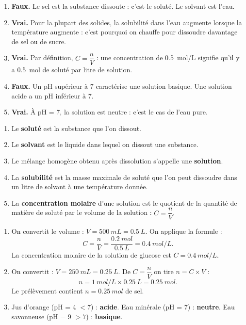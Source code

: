 \documentclass[11pt]{article}
\newcommand{\cle}[1]{{\popxbold\color{popdark}#1}}
\begin{document}
\begin{corrige}
\begin{enumerate}
\item \textbf{Faux.} Le sel est la substance dissoute : c'est le \cle{soluté}. Le solvant est l'eau.
\item \textbf{Vrai.} Pour la plupart des solides, la \cle{solubilité} dans l'eau augmente lorsque la température augmente : c'est pourquoi on chauffe pour dissoudre davantage de sel ou de sucre.
\item \textbf{Vrai.} Par définition, $C = \dfrac{n}{V}$ : une concentration de \SI{0,5}{mol/L} signifie qu'il y a \SI{0,5}{mol} de soluté par litre de solution.
\item \textbf{Faux.} Un pH supérieur à 7 caractérise une solution \cle{basique}. Une solution acide a un pH inférieur à 7.
\item \textbf{Vrai.} À pH = 7, la solution est neutre : c'est le cas de l'eau pure.
\end{enumerate}
\end{corrige}

\begin{corrige}
\begin{enumerate}
\item Le \textbf{soluté} est la substance que l'on dissout.
\item Le \textbf{solvant} est le liquide dans lequel on dissout une substance.
\item Le mélange homogène obtenu après dissolution s'appelle une \textbf{solution}.
\item La \textbf{solubilité} est la masse maximale de soluté que l'on peut dissoudre dans un litre de solvant à une température donnée.
\item La \textbf{concentration molaire} d'une solution est le quotient de la quantité de matière de soluté par le volume de la solution : $C = \dfrac{n}{V}$.
\end{enumerate}
\end{corrige}

\begin{corrige}
\begin{enumerate}
\item On convertit le volume : $V = \SI{500}{mL} = \SI{0,5}{L}$. On applique la formule :
\[ C = \frac{n}{V} = \frac{\SI{0,2}{mol}}{\SI{0,5}{L}} = \SI{0,4}{mol/L}. \]
La concentration molaire de la solution de glucose est $\boxed{C = \SI{0,4}{mol/L}}$.
\item On convertit : $V = \SI{250}{mL} = \SI{0,25}{L}$. De $C = \dfrac{n}{V}$ on tire $n = C \times V$ :
\[ n = \SI{1}{mol/L} \times \SI{0,25}{L} = \SI{0,25}{mol}. \]
Le prélèvement contient $\boxed{n = \SI{0,25}{mol}}$ de sel.
\item Jus d'orange (pH = 4 $< 7$) : \textbf{acide}. Eau minérale (pH = 7) : \textbf{neutre}. Eau savonneuse (pH = 9 $> 7$) : \textbf{basique}.
\end{enumerate}
\end{corrige}
\end{document}
